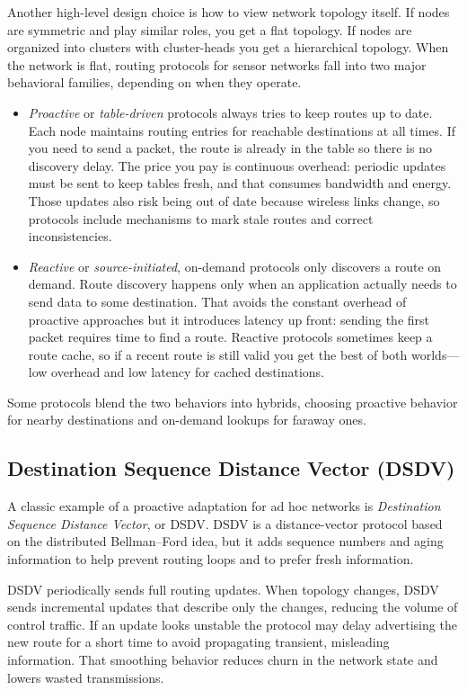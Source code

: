 Another high-level design choice is how to view network topology itself. If nodes are symmetric and play similar roles, you get a flat topology. If nodes are organized into clusters with cluster-heads you get a hierarchical topology.
When the network is flat, routing protocols for sensor networks fall into two major behavioral families, depending on when they operate.
\begin{itemize}
    \item \textit{Proactive} or \textit{table-driven} protocols always tries to keep routes up to date. Each node maintains routing entries for reachable destinations at all times. If you need to send a packet, the route is already in the table so there is no discovery delay. The price you pay is continuous overhead: periodic updates must be sent to keep tables fresh, and that consumes bandwidth and energy. Those updates also risk being out of date because wireless links change, so protocols include mechanisms to mark stale routes and correct inconsistencies.
    \item \textit{Reactive} or \textit{source-initiated}, on-demand protocols only discovers a route on demand. Route discovery happens only when an application actually needs to send data to some destination. That avoids the constant overhead of proactive approaches but it introduces latency up front: sending the first packet requires time to find a route. Reactive protocols sometimes keep a route cache, so if a recent route is still valid you get the best of both worlds—low overhead and low latency for cached destinations.
\end{itemize}
Some protocols blend the two behaviors into hybrids, choosing proactive behavior for nearby destinations and on-demand lookups for faraway ones.

\subsection{Destination Sequence Distance Vector (DSDV)}
A classic example of a proactive adaptation for ad hoc networks is \textit{Destination Sequence Distance Vector}, or DSDV. DSDV is a distance-vector protocol based on the distributed Bellman–Ford idea, but it adds sequence numbers and aging information to help prevent routing loops and to prefer fresh information.

DSDV periodically sends full routing updates. When topology changes, DSDV sends incremental updates that describe only the changes, reducing the volume of control traffic. If an update looks unstable the protocol may delay advertising the new route for a short time to avoid propagating transient, misleading information. That smoothing behavior reduces churn in the network state and lowers wasted transmissions.

